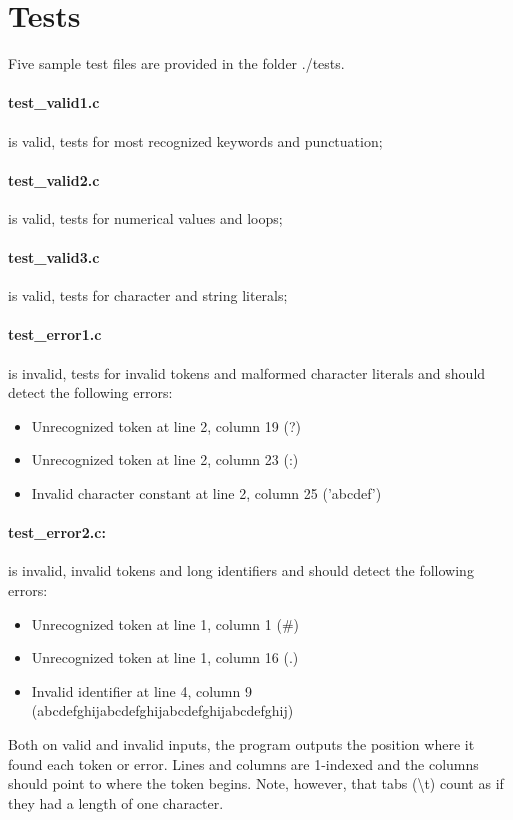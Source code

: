 \documentclass[12pt]{article}
\begin{document}
\section{Tests}
Five sample test files are provided in the folder ./tests.

\paragraph{test{\_}valid1.c} is valid, tests for most recognized keywords and punctuation;
\paragraph{test{\_}valid2.c} is valid, tests for numerical values and loops;
\paragraph{test{\_}valid3.c} is valid, tests for character and string literals;
\paragraph{test{\_}error1.c} is invalid, tests for invalid tokens and malformed character literals
and should detect the following errors:
\begin{itemize}
\item Unrecognized token at line 2, column 19 (?)
\item Unrecognized token at line 2, column 23 (:)
\item Invalid character constant at line 2, column 25 ('abcdef')
\end{itemize}

\paragraph{test{\_}error2.c:} is invalid, invalid tokens and long identifiers and  should
detect the following errors:
\begin{itemize}
\item Unrecognized token at line 1, column 1  (\#)
\item Unrecognized token at line 1, column 16 (.)
\item Invalid identifier at line 4, column 9  (abcdefghijabcdefghijabcdefghijabcdefghij)
\end{itemize}

Both on valid and invalid inputs, the program outputs the position where it found each token or
error. Lines and columns are 1-indexed and the columns should point to where the token begins.
Note, however, that tabs (\textbackslash t) count as if they had a length of one character.

\printbibliography
\end{document}
